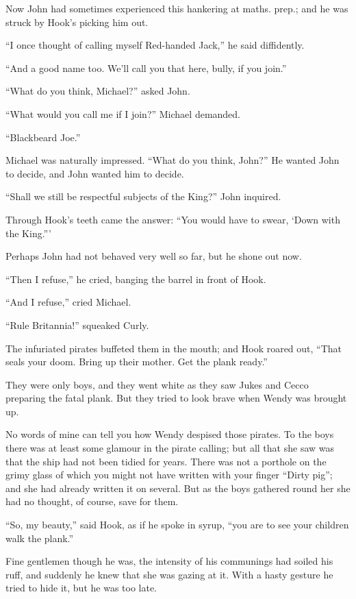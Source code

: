 Now John had sometimes experienced this hankering at maths. prep.; and
he was struck by Hook's picking him out.

``I once thought of calling myself Red-handed Jack,'' he said
diffidently.

``And a good name too. We'll call you that here, bully, if you join.''

``What do you think, Michael?'' asked John.

``What would you call me if I join?'' Michael demanded.

``Blackbeard Joe.''

Michael was naturally impressed. ``What do you think, John?'' He wanted
John to decide, and John wanted him to decide.

``Shall we still be respectful subjects of the King?'' John inquired.

Through Hook's teeth came the answer: ``You would have to swear, ‘Down
with the King.'''

Perhaps John had not behaved very well so far, but he shone out now.

``Then I refuse,'' he cried, banging the barrel in front of Hook.

``And I refuse,'' cried Michael.

``Rule Britannia!'' squeaked Curly.

The infuriated pirates buffeted them in the mouth; and Hook roared out,
``That seals your doom. Bring up their mother. Get the plank ready.''

They were only boys, and they went white as they saw Jukes and Cecco
preparing the fatal plank. But they tried to look brave when Wendy was
brought up.

No words of mine can tell you how Wendy despised those pirates. To the
boys there was at least some glamour in the pirate calling; but all
that she saw was that the ship had not been tidied for years. There was
not a porthole on the grimy glass of which you might not have written
with your finger ``Dirty pig''; and she had already written it on
several. But as the boys gathered round her she had no thought, of
course, save for them.

``So, my beauty,'' said Hook, as if he spoke in syrup, ``you are to see
your children walk the plank.''

Fine gentlemen though he was, the intensity of his communings had
soiled his ruff, and suddenly he knew that she was gazing at it. With a
hasty gesture he tried to hide it, but he was too late.

